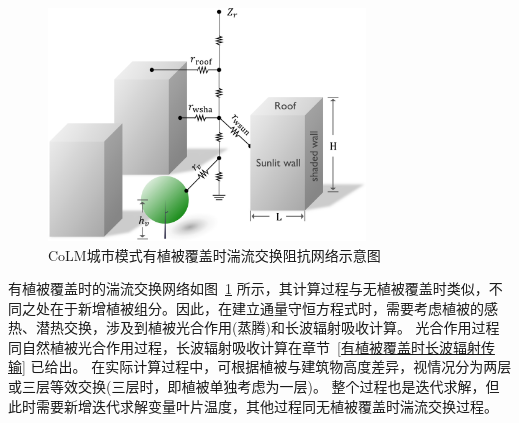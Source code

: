 {
  \begin{figure}[htbp]
    \centering
    \includegraphics[width=0.75\textwidth]{Figures/城市模式/CoLM城市模式包含植被湍流交换阻抗网络.png}
    \caption{CoLM城市模式有植被覆盖时湍流交换阻抗网络示意图}
    \label{fig:有植被覆盖时城市湍流交换阻抗示意图}
  \end{figure}
}
有植被覆盖时的湍流交换网络如图~\ref{fig:有植被覆盖时城市湍流交换阻抗示意图} 所示，其计算过程与无植被覆盖时类似，不同之处在于新增植被组分。因此，在建立通量守恒方程式时，需要考虑植被的感热、潜热交换，涉及到植被光合作用(蒸腾)和长波辐射吸收计算。
光合作用过程同自然植被光合作用过程，长波辐射吸收计算在章节~\ref{有植被覆盖时长波辐射传输} 已给出。
在实际计算过程中，可根据植被与建筑物高度差异，视情况分为两层或三层等效交换(三层时，即植被单独考虑为一层)。
整个过程也是迭代求解，但此时需要新增迭代求解变量叶片温度，其他过程同无植被覆盖时湍流交换过程。

